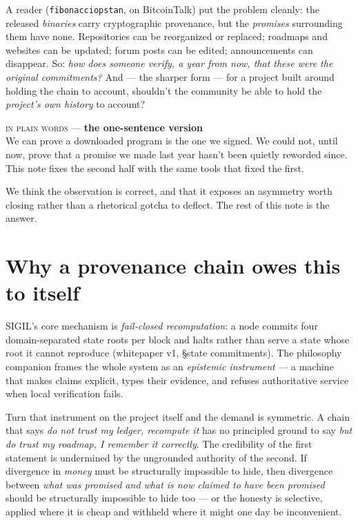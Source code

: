 \documentclass[10pt,a4paper]{article}
\newcommand{\layman}[3]{%
\begin{tcolorbox}[enhanced,
  interior style={left color=#1!9,right color=white},
  colframe=#1!45!slate,boxrule=0.5pt,arc=3pt,
  borderline west={2.5pt}{0pt}{#1},
  left=9pt,right=9pt,top=7pt,bottom=7pt]
{\scriptsize\textcolor{#1}{\textsc{in plain words}}\; — \;\textbf{\small #2}}\\[3pt]
\small #3
\end{tcolorbox}}
\begin{document}
A reader (\texttt{fibonacciopstan}, on BitcoinTalk) put the problem cleanly: the
released \emph{binaries} carry cryptographic provenance, but the \emph{promises}
surrounding them have none. Repositories can be reorganized or replaced; roadmaps and
websites can be updated; forum posts can be edited; announcements can disappear. So:
\emph{how does someone verify, a year from now, that these were the original
commitments?} And --- the sharper form --- for a project built around holding the chain
to account, shouldn't the community be able to hold the \emph{project's own history}
to account?

\layman{sigilcyan}{the one-sentence version}{We can prove a downloaded program is the
one we signed. We could not, until now, prove that a promise we made last year hasn't
been quietly reworded since. This note fixes the second half with the same tools that
fixed the first.}

We think the observation is correct, and that it exposes an asymmetry worth closing
rather than a rhetorical gotcha to deflect. The rest of this note is the answer.

\section{Why a provenance chain owes this to itself}
SIGIL's core mechanism is \emph{fail-closed recomputation}: a node commits four
domain-separated state roots per block and halts rather than serve a state whose root
it cannot reproduce (whitepaper v1, \S state commitments). The philosophy companion
frames the whole system as an \emph{epistemic instrument} --- a machine that makes
claims explicit, types their evidence, and refuses authoritative service when local
verification fails.

Turn that instrument on the project itself and the demand is symmetric. A chain that
says \emph{do not trust my ledger, recompute it} has no principled ground to say
\emph{but do trust my roadmap, I remember it correctly}. The credibility of the first
statement is undermined by the ungrounded authority of the second. If divergence in
\emph{money} must be structurally impossible to hide, then divergence between
\emph{what was promised and what is now claimed to have been promised} should be
structurally impossible to hide too --- or the honesty is selective, applied where it
is cheap and withheld where it might one day be inconvenient.
\end{document}
